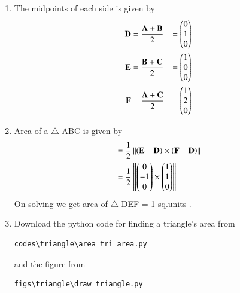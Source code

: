 \begin{enumerate}[label=\thesection.\arabic*.,ref=\thesection.\theenumi]
\item The midpoints of each side is given by
\begin{align}
\mathbf{D} &= \frac{\mathbf{A}+\mathbf{B}}{2} &= \begin{pmatrix}0\\1\\0\end{pmatrix} \\
\mathbf{E} &= \frac{\mathbf{B}+\mathbf{C}}{2} &= \begin{pmatrix}1\\0\\0\end{pmatrix} \\
\mathbf{F} &= \frac{\mathbf{A}+\mathbf{C}}{2} &= \begin{pmatrix}1\\2\\0\end{pmatrix} \\
\end{align}
\item Area of a $\triangle$ ABC is given by 
\begin{align}
&= \frac{1}{2} \left\lVert\left(\mathbf{E}-\mathbf{D}\right)\times\left(\mathbf{F}-\mathbf{D}\right)\right\rVert\\
&= \frac{1}{2}\left\lVert\begin{pmatrix}0\\-1\\0\end{pmatrix} \times \begin{pmatrix}1\\1\\0\end{pmatrix}\right\rVert
\end{align}
On solving we get area of $\triangle$ DEF = 1 sq.units .

\item Download the python code for finding a triangle's area from
\begin{lstlisting}
codes\triangle\area_tri_area.py
\end{lstlisting}
and the figure from
\begin{lstlisting}
figs\triangle\draw_triangle.py
\end{lstlisting}

\end{enumerate}